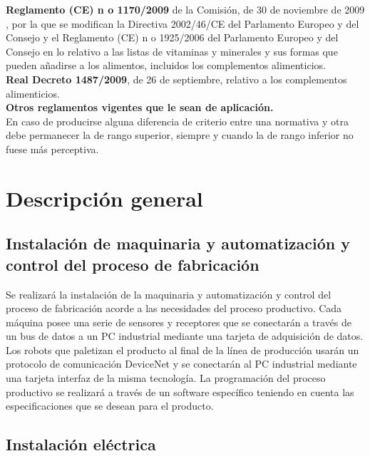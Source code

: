 {\bfseries Reglamento (CE) n o 1170/2009} de la Comisión, de 30 de noviembre de 2009 , por la que se modifican la Directiva 2002/46/CE del Parlamento Europeo y del Consejo y el Reglamento (CE) n o 1925/2006 del Parlamento Europeo y del Consejo en lo relativo a las listas de vitaminas y minerales y sus formas que pueden añadirse a los alimentos, incluidos los complementos alimenticios.\\

{\bfseries Real Decreto 1487/2009}, de 26 de septiembre, relativo a los complementos
alimenticios.\\

{\bfseries Otros reglamentos vigentes que le sean de aplicación.}\\

En caso de producirse alguna diferencia de criterio entre una normativa y otra debe permanecer la de rango superior, siempre y cuando la de rango inferior no fuese más perceptiva.

\pagebreak

\section{Descripción general}

\subsection{Instalación de maquinaria y automatización y control del proceso de fabricación}

Se realizará la instalación de la maquinaria y automatización y control del proceso de fabricación acorde a las necesidades del proceso productivo. Cada máquina posee una serie de sensores y receptores que se conectarán a través de un bus de datos  a un PC industrial mediante una tarjeta de adquisición de datos. Los robots que paletizan el producto al final de la línea de producción usarán un protocolo de comunicación DeviceNet y se conectarán al PC industrial mediante una tarjeta interfaz de la misma tecnología. La programación del proceso productivo se realizará a través de un software específico teniendo en cuenta las especificaciones que se desean para el producto.

\subsection{Instalación eléctrica}

